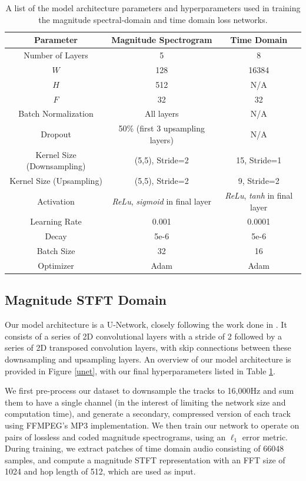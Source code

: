\documentclass[sigconf]{acmart}
\begin{document}
\begin{table}[h!]
    \centering
    \begin{tabular}{|c||c|c|}
        \hline
        \textbf{Parameter} & \textbf{Magnitude Spectrogram} & \textbf{Time Domain} \\
        \hline
        Number of Layers & 5 & 8 \\
        $W$ & 128 & 16384 \\
        $H$ & 512 & N/A \\
        $F$ & 32 & 32 \\
        Batch Normalization & All layers & N/A \\
        Dropout & 50\% (first 3 upsampling layers) & N/A \\
        Kernel Size (Downsampling) & (5,5), Stride=2 & 15, Stride=1 \\
        Kernel Size (Upsampling) & (5,5), Stride=2 & 9, Stride=2 \\
        Activation & \textit{ReLu}, \textit{sigmoid} in final layer & \textit{ReLu}, \textit{tanh} in final layer \\
        Learning Rate & 0.001 & 0.0001 \\
        Decay & 5e-6 & 5e-6 \\
        Batch Size & 32 & 16 \\
        Optimizer & Adam & Adam \\
        \hline
    \end{tabular}
    \caption{A list of the model architecture parameters and hyperparameters used in training the magnitude spectral-domain and time domain loss networks.}
    \label{params}
\end{table}



\subsection{Magnitude STFT Domain}
Our model architecture is a U-Network, closely following the work done in \cite{jansson2017singing}. It consists of a series of 2D convolutional layers with a stride of 2 followed by a series of 2D transposed convolution layers, with skip connections between these downsampling and upsampling layers.  An overview of our model architecture is provided in Figure \ref{unet}, with our final hyperparameters listed in Table \ref{params}.

We first pre-process our dataset to downsample the tracks to 16,000Hz and sum them to have a single channel (in the interest of limiting the network size and computation time), and generate a secondary, compressed version of each track using FFMPEG's MP3 implementation. We then train our network to operate on pairs of lossless and coded magnitude spectrograms, using an $\ell_{1}$ error metric. During training, we extract patches of time domain audio consisting of 66048 samples, and compute a magnitude STFT representation with an FFT size of 1024 and hop length of 512, which are used as input. 
\end{document}
